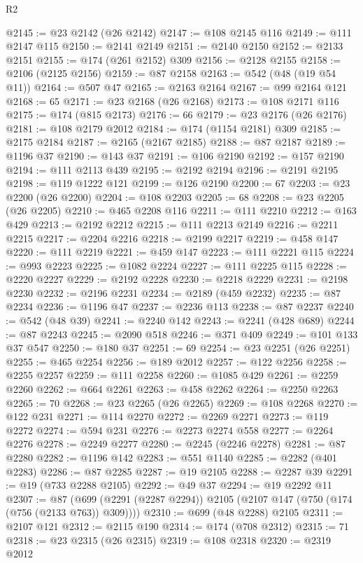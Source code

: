 \begin{lexlean}{R2}
\begin{coremodule}
@2145 := @23 @2142 (@26 @2142)
@2147 := @108 @2145 @116
@2149 := @111 @2147 @115
@2150 := @2141 @2149
@2151 := @2140 @2150
@2152 := @2133 @2151
@2155 := @174 (@261 @2152) @309
@2156 := @2128 @2155
@2158 := @2106 (@2125 @2156)
@2159 := @87 @2158
@2163 := @542 (@48 (@19 @54 @11))
@2164 := @507 @47
@2165 := @2163 @2164
@2167 := @99 @2164 @121
@2168 := 65
@2171 := @23 @2168 (@26 @2168)
@2173 := @108 @2171 @116
@2175 := @174 (@815 @2173)
@2176 := 66
@2179 := @23 @2176 (@26 @2176)
@2181 := @108 @2179 @2012
@2184 := @174 (@1154 @2181) @309
@2185 := @2175 @2184
@2187 := @2165 (@2167 @2185)
@2188 := @87 @2187
@2189 := @1196 @37
@2190 := @143 @37
@2191 := @106 @2190
@2192 := @157 @2190
@2194 := @111 @2113 @439
@2195 := @2192 @2194
@2196 := @2191 @2195
@2198 := @119 @1222 @121
@2199 := @126 @2190
@2200 := 67
@2203 := @23 @2200 (@26 @2200)
@2204 := @108 @2203
@2205 := 68
@2208 := @23 @2205 (@26 @2205)
@2210 := @465 @2208 @116
@2211 := @111 @2210
@2212 := @163 @429
@2213 := @2192 @2212
@2215 := @111 @2213 @2149
@2216 := @2211 @2215
@2217 := @2204 @2216
@2218 := @2199 @2217
@2219 := @458 @147
@2220 := @111 @2219
@2221 := @459 @147
@2223 := @111 @2221 @115
@2224 := @993 @2223
@2225 := @1082 @2224
@2227 := @111 @2225 @115
@2228 := @2220 @2227
@2229 := @2192 @2228
@2230 := @2218 @2229
@2231 := @2198 @2230
@2232 := @2196 @2231
@2234 := @2189 (@459 @2232)
@2235 := @87 @2234
@2236 := @1196 @47
@2237 := @2236 @113
@2238 := @87 @2237
@2240 := @542 (@48 @39)
@2241 := @2240 @142
@2243 := @2241 (@428 @689)
@2244 := @87 @2243
@2245 := @2090 @518
@2246 := @371 @409
@2249 := @101 @133 @37 @547
@2250 := @180 @37
@2251 := 69
@2254 := @23 @2251 (@26 @2251)
@2255 := @465 @2254
@2256 := @189 @2012
@2257 := @122 @2256
@2258 := @2255 @2257
@2259 := @111 @2258
@2260 := @1085 @429
@2261 := @2259 @2260
@2262 := @664 @2261
@2263 := @458 @2262
@2264 := @2250 @2263
@2265 := 70
@2268 := @23 @2265 (@26 @2265)
@2269 := @108 @2268
@2270 := @122 @231
@2271 := @114 @2270
@2272 := @2269 @2271
@2273 := @119 @2272
@2274 := @594 @231
@2276 := @2273 @2274 @558
@2277 := @2264 @2276
@2278 := @2249 @2277
@2280 := @2245 (@2246 @2278)
@2281 := @87 @2280
@2282 := @1196 @142
@2283 := @551 @1140
@2285 := @2282 (@401 @2283)
@2286 := @87 @2285
@2287 := @19 @2105
@2288 := @2287 @39
@2291 := @19 (@733 @2288 @2105)
@2292 := @49 @37
@2294 := @19 @2292 @11
@2307 := @87 (@699 (@2291 (@2287 @2294)) @2105 (@2107 @147 (@750 (@174 (@756 (@2133 @763)) @309))))
@2310 := @699 (@48 @2288) @2105
@2311 := @2107 @121
@2312 := @2115 @190
@2314 := @174 (@708 @2312)
@2315 := 71
@2318 := @23 @2315 (@26 @2315)
@2319 := @108 @2318
@2320 := @2319 @2012

\end{coremodule}
\end{lexlean}
